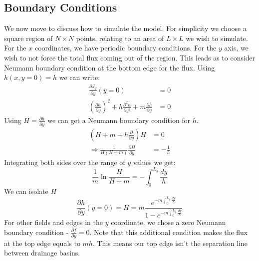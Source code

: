 \documentclass{article}
\numberwithin{equation}{section}
\begin{document}
\subsection{Boundary Conditions}
We now move to discuss how to simulate the model. For simplicity we choose a square region of $N\times N$ points, relating to an area of  $L\times L$  we wish to simulate. For the $x$ coordinates, we have periodic boundary conditions. For the $y$ axis, we wish to not force the total flux coming out of the region. This leads as to consider Neumann boundary condition at the bottom edge for the flux. Using $h(x,y=0)=h$ we can write:
\begin{align}
    \frac{\partial J_y}{\partial y}(y=0)                                                                                 & = 0 \\
    \left(\frac{\partial h}{\partial y}\right)^2 + h \frac{\partial^2 h}{\partial y^2} + m \frac{\partial h}{\partial y} & = 0
\end{align}
Using $H=\frac{\partial h}{\partial y}$ we can get a Neumann boundary condition for $h$.
\begin{align}
    \left(H + m + h\frac{\partial}{\partial y}\right)H         & = 0             \\
    \Rightarrow \frac{1}{H(H+m)} \frac{\partial H}{\partial y} & = - \frac{1}{h}
\end{align}
Integrating both sides over the range of $y$ values we get:
\begin{equation}
    \frac{1}{m}\ln{\frac{H}{H+m}} = -\int_0^{L_y} \frac{dy}{h}
\end{equation}
We can isolate $H$
\begin{equation}
    \frac{\partial h}{\partial y} (y=0) = H = m \frac{e^{-m \int_0^{L_y} \frac{dy}{h}}}{1 - e^{-m \int_0^{L_y} \frac{dy}{h}}}
\end{equation}
For other fields and edges in the $y$ coordinate, we chose a zero Neumann boundary condition - $\frac{\partial f}{\partial y}=0$. Note that this additional condition makes the flux at the top edge equals to $mh$. This means our top edge isn't the separation line between drainage basins.
\end{document}
